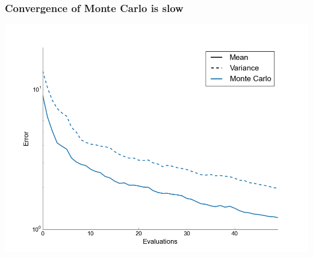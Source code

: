 \documentclass[handout]{beamer}
\newcommand{\E}[1]{\mbox{E}\!\left(#1\right)}
\newcommand{\Var}[1]{\mbox{Var}\!\left(#1\right)}
\begin{document}
\begin{frame}
  \frametitle{Convergence of Monte Carlo is slow}
  \begin{center}
    \includegraphics[width=1\textwidth]{MC_convergence_2D.png}
  \end{center}
\end{frame}


%
\end{document}

